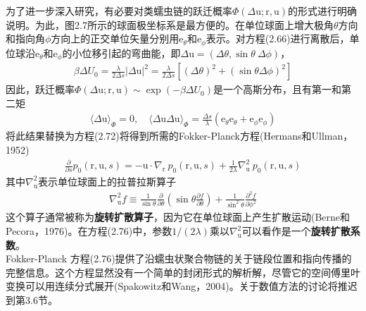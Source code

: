 为了进一步深入研究，有必要对类蠕虫链的跃迁概率$\Phi(\Delta \mathrm{u};\mathrm{r},\mathrm{u})$的形式进行明确说明。为此，图2.7所示的球面极坐标系是最方便的。在单位球面上增大极角$\theta$方向和指向角$\phi$方向上的正交单位矢量分别用$\mathrm{e}_\theta$和$\mathrm{e}_\phi$表示。对方程(2.66)进行离散后，单位球沿$\mathrm{e}_\theta$和$\mathrm{e}_\phi$的小位移引起的弯曲能，即$\Delta \mathrm{u}=(\Delta \theta ,\sin \theta \ \Delta \phi)$，\\
\begin{gather}
\beta\Delta U_0 =\frac{\lambda}{2\Delta s}|\Delta \mathrm{u}|^2 =\frac{\lambda}{2\Delta s}[(\Delta\theta)^2+(\sin \theta \Delta \phi)^2]
\end{gather}
因此，跃迁概率$\Phi(\Delta \mathrm{u};\mathrm{r},\mathrm{u})\sim 
\exp(-\beta \Delta U_0)$是一个高斯分布，且有第一和第二矩\\
\begin{gather}
\langle \Delta \mathrm{u}\rangle_\Phi =0,\quad \langle \Delta \mathrm{u}\Delta \mathrm{u}\rangle_\Phi =\frac{\Delta s}{\lambda}(\mathrm{e}_\theta \mathrm{e}_\theta+\mathrm{e}_\phi \mathrm{e}_\phi)
\end{gather}
将此结果替换为方程(2.72)将得到所需的Fokker-Planck方程(Hermans和Ullman，1952)\\
\begin{gather}
\frac{\partial}{\partial s}p_0(\mathrm{r},\mathrm{u},s) =-\mathrm{u} \cdot \nabla_\mathrm{r} \ p_0(\mathrm{r},\mathrm{u},s)+\frac{1}{2\lambda}\nabla_\mathrm{u}^2\  p_0(\mathrm{r},\mathrm{u},s)
\end{gather}
其中$\nabla_\mathrm{u}^2$表示单位球面上的拉普拉斯算子\\
\begin{gather}
\nabla_\mathrm{u}^2 f \equiv \frac{1}{\sin\theta}\frac{\partial}{\partial\theta}\left(\sin\theta \frac{\partial f}{\partial \theta}\right)+\frac{1}{\sin^2\theta}\frac{\partial^2f}{\partial\phi^2}
\end{gather}
这个算子通常被称为\textbf{旋转扩散算子}，因为它在单位球面上产生扩散运动(Berne和Pecora，1976)。在方程(2.76)中，参数$1/(2\lambda)$乘以$\nabla_\mathrm{u}^2$可以看作是一个\textbf{旋转扩散系数}。\\

Fokker-Planck 方程(2.76)提供了沿蠕虫状聚合物链的关于链段位置和指向传播的完整信息。这个方程显然没有一个简单的封闭形式的解析解，尽管它的空间傅里叶变换可以用连续分式展开(Spakowitz和Wang，2004)。关于数值方法的讨论将推迟到第3.6节。\\

